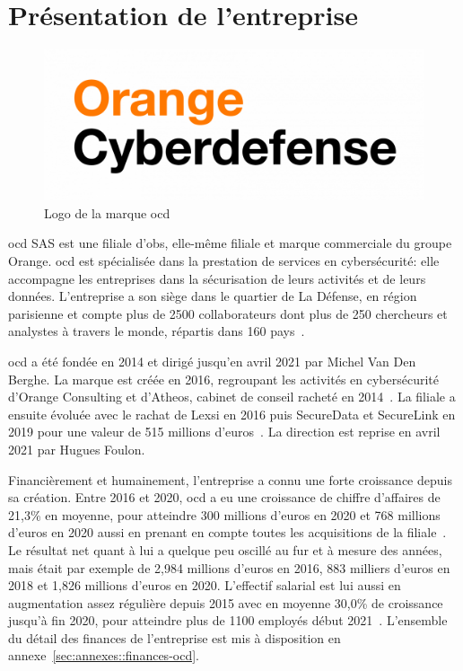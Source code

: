 \documentclass[12pt, oneside, a4paper, titlepage]{report}
\begin{document}
\section{Présentation de l'entreprise}%
\label{sec:intro::entreprise}

\begin{figure}[h!]
    \centering
    \includegraphics[width = 0.8\linewidth]{img/logo/ocd.png}
    \caption{Logo de la marque \acrlong{ocd}}%
    \label{fig:logo/ocd}
\end{figure}

\Gls{ocd} SAS est une filiale d'\gls{obs}, elle-même filiale et marque
commerciale du groupe Orange. \gls{ocd} est spécialisée dans la prestation de
services en cybersécurité: elle accompagne les entreprises dans la sécurisation
de leurs activités et de leurs données. L'entreprise a son siège dans le
quartier de La Défense, en région parisienne et compte plus de 2500
collaborateurs dont plus de 250 chercheurs et analystes à travers le monde,
répartis dans 160 pays~\cite{ocd}.

\acrlong{ocd} a été fondée en 2014 et dirigé jusqu'en avril 2021 par Michel Van
Den Berghe. La marque est créée en 2016, regroupant les activités en
cybersécurité d'Orange Consulting et d'Atheos, cabinet de conseil racheté en
2014~\cite{rachat-atheos}.  La filiale a ensuite évoluée avec le rachat de Lexsi
en 2016 puis SecureData et SecureLink en 2019 pour une valeur de 515 millions
d'euros~\cite{rachat-securelink}. La direction est reprise en avril 2021 par
Hugues Foulon.

Financièrement et humainement, l'entreprise a connu une forte croissance depuis
sa création. Entre 2016 et 2020, \gls{ocd} a eu une croissance de chiffre
d'affaires de 21,3\% en moyenne, pour atteindre 300 millions d'euros en 2020 et
768 millions d'euros en 2020 aussi en prenant en compte toutes les acquisitions
de la filiale~\cite{ocd}. Le résultat net quant à lui a quelque peu oscillé au
fur et à mesure des années, mais était par exemple de 2,984 millions d'euros en
2016, 883 milliers d'euros en 2018 et 1,826 millions d'euros en 2020. L'effectif
salarial est lui aussi en augmentation assez régulière depuis 2015 avec en
moyenne 30,0\% de croissance jusqu'à fin 2020, pour atteindre plus de 1100
employés début 2021~\cite{finances-ocd}. L'ensemble du détail des finances de
l'entreprise est mis à disposition en annexe~\ref{sec:annexes::finances-ocd}.
\end{document}
